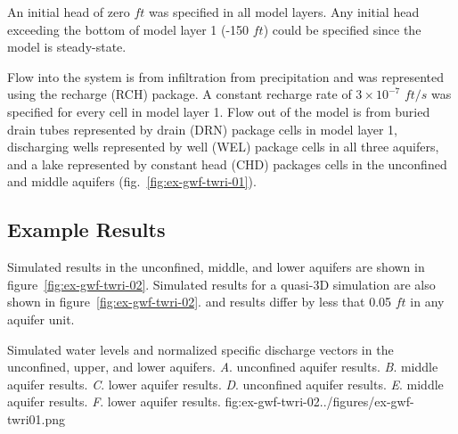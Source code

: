


An initial head of zero $ft$ was specified in all model layers. Any initial head exceeding the bottom of model layer 1 (-150 $ft$) could be specified since the model is steady-state.

Flow into the system is from infiltration from precipitation and was represented using the recharge (RCH) package. A constant recharge rate of $3 \times 10^{-7}$ $ft/s$ was specified for every cell in model layer 1. Flow out of the model is from buried drain tubes represented by drain (DRN) package cells in model layer 1, discharging wells represented by well (WEL) package cells in all three aquifers, and a lake represented by constant head (CHD) packages cells in the unconfined and middle aquifers (fig.~\ref{fig:ex-gwf-twri-01}).

\subsection{Example Results}

Simulated results in the unconfined, middle, and lower aquifers are shown in figure~\ref{fig:ex-gwf-twri-02}. Simulated results for a quasi-3D \mff simulation are also shown in figure~\ref{fig:ex-gwf-twri-02}. \mf and \mff results differ by less that 0.05 $ft$ in any aquifer unit.

\begin{StandardFigure}{
                                     Simulated water levels and normalized specific discharge vectors in 
                                     the unconfined, upper, and lower aquifers. 
                                     \textit{A}. \mf unconfined aquifer results.
                                     \textit{B}. \mf middle aquifer results.
                                     \textit{C}. \mf lower aquifer results.
                                     \textit{D}. \mff unconfined aquifer results.
                                     \textit{E}. \mff middle aquifer results.
                                     \textit{F}. \mff lower aquifer results.
                                     }{fig:ex-gwf-twri-02}{../figures/ex-gwf-twri01.png}
\end{StandardFigure}                                 

